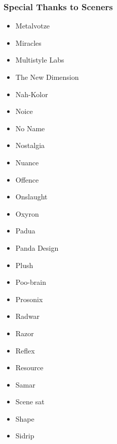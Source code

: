 \begin{frame}[noframenumbering]
\frametitle{Special Thanks to Sceners}

\begin{multicols}{3}
\begin{itemize}
\item Metalvotze
\item Miracles
\item Multistyle Labs
\item The New Dimension
\item Nah-Kolor
\item Noice
\item No Name
\item Nostalgia
\item Nuance
\item Offence
\item Onslaught
\item Oxyron
\item Padua
\item Panda Design
\item Plush
\item Poo-brain
\item Prosonix
\item Radwar
\item Razor
\item Reflex
\item Resource
\item Samar
\item Scene sat
\item Shape
\item Sidrip
\end{itemize}
\end{multicols}

\end{frame}


